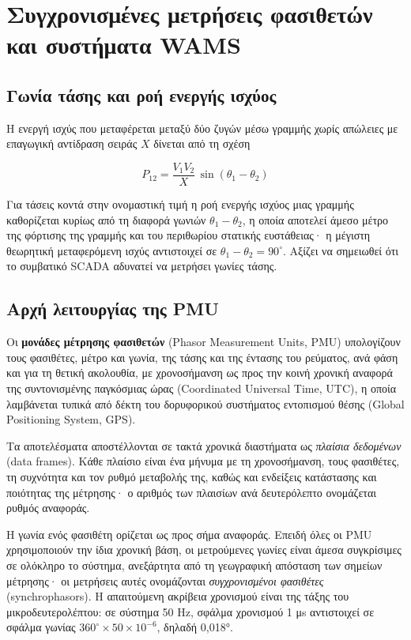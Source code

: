 \section{Συγχρονισμένες μετρήσεις φασιθετών και συστήματα WAMS}
\label{sec:wams}

\subsection{Γωνία τάσης και ροή ενεργής ισχύος}

Η ενεργή ισχύς που μεταφέρεται μεταξύ δύο ζυγών μέσω γραμμής χωρίς απώλειες με επαγωγική
αντίδραση σειράς $X$ δίνεται από τη σχέση

\begin{equation}
P_{12} = \frac{V_1 V_2}{X}\,\sin(\theta_1 - \theta_2)
\label{eq:powerflow}
\end{equation}

Για τάσεις κοντά στην ονομαστική τιμή η ροή ενεργής ισχύος μιας γραμμής καθορίζεται κυρίως από τη διαφορά γωνιών $\theta_1 - \theta_2$, η οποία
αποτελεί άμεσο μέτρο της φόρτισης της γραμμής και του περιθωρίου στατικής ευστάθειας· η μέγιστη θεωρητική
μεταφερόμενη ισχύς αντιστοιχεί σε $\theta_1 - \theta_2 = 90^\circ$. Αξίζει να σημειωθεί ότι το συμβατικό SCADA αδυνατεί να μετρήσει
γωνίες τάσης.

\subsection{Αρχή λειτουργίας της PMU}

Οι \textbf{μονάδες μέτρησης φασιθετών} (Phasor Measurement Units, PMU) υπολογίζουν τους
φασιθέτες, μέτρο και γωνία, της τάσης και της έντασης του ρεύματος, ανά φάση και για τη
θετική ακολουθία, με χρονοσήμανση ως προς την κοινή χρονική αναφορά της συντονισμένης
παγκόσμιας ώρας (Coordinated Universal Time, UTC), η οποία λαμβάνεται τυπικά από δέκτη του
δορυφορικού συστήματος εντοπισμού θέσης (Global Positioning System, GPS).

Τα αποτελέσματα αποστέλλονται σε τακτά χρονικά διαστήματα ως \emph{πλαίσια δεδομένων} (data
frames). Κάθε πλαίσιο είναι ένα μήνυμα με τη χρονοσήμανση, τους φασιθέτες, τη συχνότητα και
τον ρυθμό μεταβολής της, καθώς και ενδείξεις κατάστασης και ποιότητας της μέτρησης· ο αριθμός
των πλαισίων ανά δευτερόλεπτο ονομάζεται ρυθμός αναφοράς.

Η γωνία ενός φασιθέτη ορίζεται ως προς σήμα αναφοράς. Επειδή όλες οι PMU χρησιμοποιούν την
ίδια χρονική βάση, οι μετρούμενες γωνίες είναι άμεσα συγκρίσιμες σε ολόκληρο το σύστημα,
ανεξάρτητα από τη γεωγραφική απόσταση των σημείων μέτρησης· οι μετρήσεις αυτές ονομάζονται
\emph{συγχρονισμένοι φασιθέτες} (synchrophasors). Η απαιτούμενη ακρίβεια χρονισμού είναι της
τάξης του μικροδευτερολέπτου: σε σύστημα 50 Hz, σφάλμα χρονισμού 1 μs αντιστοιχεί σε σφάλμα
γωνίας $360^\circ \times 50 \times 10^{-6}$, δηλαδή 0,018°.

